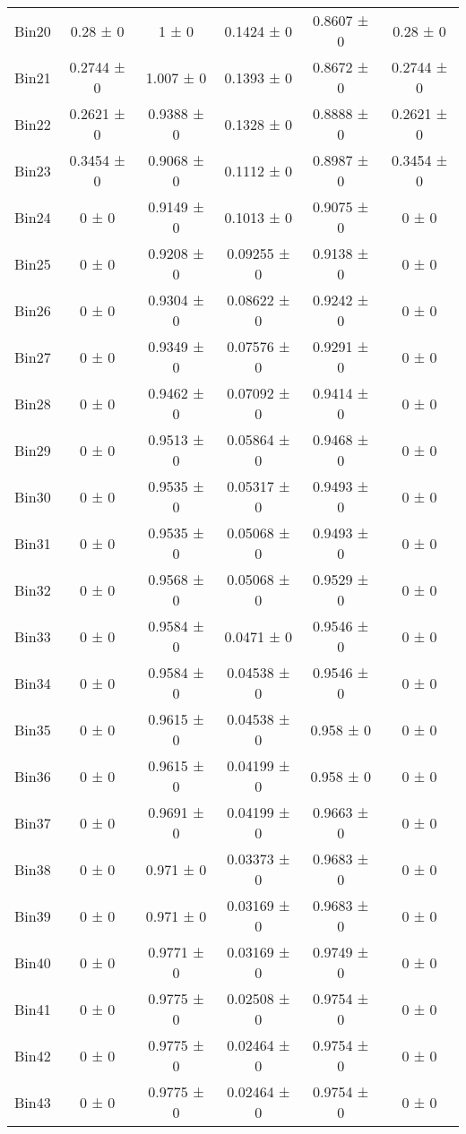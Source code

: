 \begin{tabular}{@{\extracolsep{4pt}}lccccc@{}}
     Bin20 & 0.28 ± 0 & 1 ± 0 & 0.1424 ± 0 & 0.8607 ± 0 & 0.28 ± 0 \\ 
     Bin21 & 0.2744 ± 0 & 1.007 ± 0 & 0.1393 ± 0 & 0.8672 ± 0 & 0.2744 ± 0 \\ 
     Bin22 & 0.2621 ± 0 & 0.9388 ± 0 & 0.1328 ± 0 & 0.8888 ± 0 & 0.2621 ± 0 \\ 
     Bin23 & 0.3454 ± 0 & 0.9068 ± 0 & 0.1112 ± 0 & 0.8987 ± 0 & 0.3454 ± 0 \\ 
     Bin24 & 0 ± 0 & 0.9149 ± 0 & 0.1013 ± 0 & 0.9075 ± 0 & 0 ± 0 \\ 
     Bin25 & 0 ± 0 & 0.9208 ± 0 & 0.09255 ± 0 & 0.9138 ± 0 & 0 ± 0 \\ 
     Bin26 & 0 ± 0 & 0.9304 ± 0 & 0.08622 ± 0 & 0.9242 ± 0 & 0 ± 0 \\ 
     Bin27 & 0 ± 0 & 0.9349 ± 0 & 0.07576 ± 0 & 0.9291 ± 0 & 0 ± 0 \\ 
     Bin28 & 0 ± 0 & 0.9462 ± 0 & 0.07092 ± 0 & 0.9414 ± 0 & 0 ± 0 \\ 
     Bin29 & 0 ± 0 & 0.9513 ± 0 & 0.05864 ± 0 & 0.9468 ± 0 & 0 ± 0 \\ 
     Bin30 & 0 ± 0 & 0.9535 ± 0 & 0.05317 ± 0 & 0.9493 ± 0 & 0 ± 0 \\ 
     Bin31 & 0 ± 0 & 0.9535 ± 0 & 0.05068 ± 0 & 0.9493 ± 0 & 0 ± 0 \\ 
     Bin32 & 0 ± 0 & 0.9568 ± 0 & 0.05068 ± 0 & 0.9529 ± 0 & 0 ± 0 \\ 
     Bin33 & 0 ± 0 & 0.9584 ± 0 & 0.0471 ± 0 & 0.9546 ± 0 & 0 ± 0 \\ 
     Bin34 & 0 ± 0 & 0.9584 ± 0 & 0.04538 ± 0 & 0.9546 ± 0 & 0 ± 0 \\ 
     Bin35 & 0 ± 0 & 0.9615 ± 0 & 0.04538 ± 0 & 0.958 ± 0 & 0 ± 0 \\ 
     Bin36 & 0 ± 0 & 0.9615 ± 0 & 0.04199 ± 0 & 0.958 ± 0 & 0 ± 0 \\ 
     Bin37 & 0 ± 0 & 0.9691 ± 0 & 0.04199 ± 0 & 0.9663 ± 0 & 0 ± 0 \\ 
     Bin38 & 0 ± 0 & 0.971 ± 0 & 0.03373 ± 0 & 0.9683 ± 0 & 0 ± 0 \\ 
     Bin39 & 0 ± 0 & 0.971 ± 0 & 0.03169 ± 0 & 0.9683 ± 0 & 0 ± 0 \\ 
     Bin40 & 0 ± 0 & 0.9771 ± 0 & 0.03169 ± 0 & 0.9749 ± 0 & 0 ± 0 \\ 
     Bin41 & 0 ± 0 & 0.9775 ± 0 & 0.02508 ± 0 & 0.9754 ± 0 & 0 ± 0 \\ 
     Bin42 & 0 ± 0 & 0.9775 ± 0 & 0.02464 ± 0 & 0.9754 ± 0 & 0 ± 0 \\ 
     Bin43 & 0 ± 0 & 0.9775 ± 0 & 0.02464 ± 0 & 0.9754 ± 0 & 0 ± 0 \\ 

\end{tabular}
